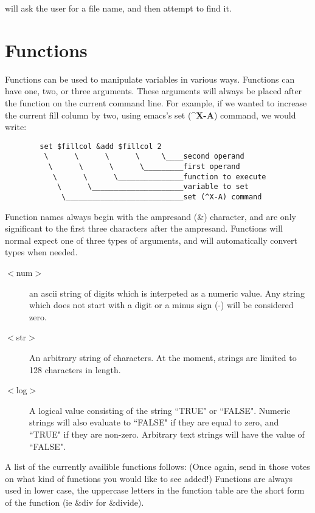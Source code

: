 will ask the user for a file name, and then attempt to find it.

\section{Functions}

Functions can be used to manipulate variables in various ways.
Functions can have one, two, or three arguments.  These arguments will
always be placed after the function on the current command line.  For
example, if we wanted to increase the current fill column by two, using
emacs's set ({\bf{}\^{}X-A}) command, we would write:

\begin{verbatim}
        set $fillcol &add $fillcol 2
         \      \      \      \     \____second operand
          \      \      \      \_________first operand
           \      \      \_______________function to execute
            \      \_____________________variable to set
             \___________________________set (^X-A) command
\end{verbatim}

Function names always begin with the ampresand (\&) character,
and are only significant to the first three characters after the
ampresand.  Functions will normal expect one of three types of
arguments, and will automatically convert types when needed.

\begin{description}

\item[$<${}num$>${}] an ascii string of digits which is interpeted as
a numeric value.  Any string which does not start with a digit or a
minus sign (-) will be considered zero.

\item[$<${}str$>${}] An arbitrary string of characters.  At the
moment, strings are limited to 128 characters in length.

\item[$<${}log$>${}] A logical value consisting of the string ``TRUE"
or ``FALSE".  Numeric strings will also evaluate to ``FALSE" if they
are equal to zero, and ``TRUE" if they are non-zero.  Arbitrary text
strings will have the value of ``FALSE".

\end{description}

A list of the currently availible functions follows: (Once
again, send in those votes on what kind of functions you would like to
see added!) Functions are always used in lower case, the uppercase
letters in the function table are the short form of the function (ie
\&div for \&divide).

